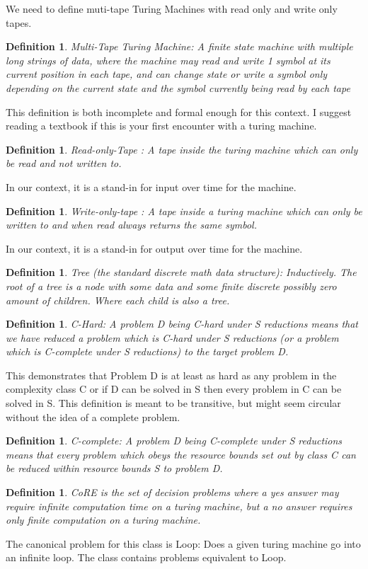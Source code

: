 \documentclass[12pt]{article}
\newtheorem{mydef}[thm]{Definition}
\begin{document}
We need to define muti-tape Turing Machines with read only and write only tapes. 
\begin{mydef} Multi-Tape Turing Machine: A finite state machine with multiple long strings of data, where the machine may read and write 1 symbol at its current position in each tape, and can change state or write a symbol only depending on the current state and the symbol currently being read by each tape \end{mydef}
This definition is both incomplete and formal enough for this context. I suggest reading a textbook if this is your first encounter with a turing machine.
\begin{mydef}Read-only-Tape : A tape inside the turing machine which can only be read and not written to.\end{mydef}  In our context, it is a stand-in for input over time for the machine.
\begin{mydef} Write-only-tape : A tape inside a turing machine  which can only be written to and when read always returns the same symbol. \end{mydef}  In our context, it is a stand-in for output over time for the machine.
\begin{mydef}Tree (the standard discrete math data structure):
Inductively. The root of a tree is a node with some data and some finite discrete possibly zero amount of children. Where each child is also a tree.
\end{mydef}
\begin{mydef} C-Hard: A problem D being C-hard under S reductions means that we have reduced a problem which is C-hard under S reductions (or a problem which is C-complete under S reductions) to the target problem D. 
\end{mydef}
This demonstrates that Problem D is at least as hard as any problem in the complexity class C or if D can be solved in S then every problem in C can be solved in S. This definition is meant to be transitive, but might seem circular without the idea of a complete problem.
\begin{mydef}C-complete: A problem D being C-complete under S reductions means that every problem which obeys the resource bounds set out by class C can be reduced within resource bounds S to problem D. \end{mydef}
\begin{mydef}CoRE is the set of decision problems where a yes answer may require infinite computation time on a turing machine, but a no answer requires only finite computation on a turing machine.  \end{mydef} The canonical problem for this class is Loop: Does a given turing machine go into an infinite loop. The class contains problems equivalent to Loop.
\end{document}

